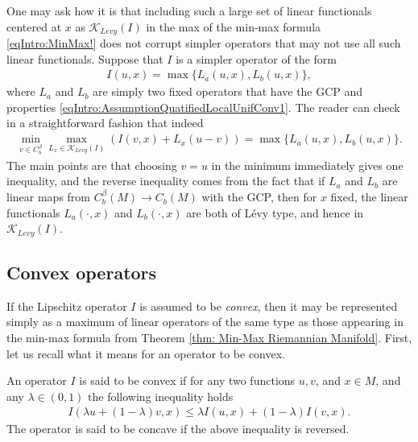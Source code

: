\documentclass[11pt,reqno]{amsart}
\numberwithin{equation}{section}
\theoremstyle{plain}
\def\K{\mathcal K}
\begin{document}
\begin{rem}
	One may ask how it is that including such a large set of linear functionals centered at $x$ as $\K_{Levy}(I)$ in the max of the min-max formula \eqref{eqIntro:MinMax!} does not corrupt simpler operators that may not use all such linear functionals.  Suppose that $I$ is a simpler operator of the form
	\begin{align*}
		I(u,x) = \max\{L_a(u,x), L_b(u,x)\},
	\end{align*}
	where $L_a$ and $L_b$ are simply two fixed operators that have the GCP and properties \eqref{eqIntro:AssumptionQuatifiedLocalUnifConv1}.  The reader can check in a straightforward fashion that indeed
	\begin{align*}
		\min_{v\in C^\beta_b} \max_{L_x\in \K_{Levy}(I)} \left( I(v,x) + L_x(u-v)    \right)
		= \max\{L_a(u,x), L_b(u,x)\}.
	\end{align*}
	The main points are that choosing $v=u$ in the minimum immediately gives one inequality, and the reverse inequality comes from the fact that if $L_a$ and $L_b$ are linear maps from $C^\beta_b(M)\to C_b(M)$ with the GCP, then for $x$ fixed, the linear functionals $L_a(\cdot,x)$ and $L_b(\cdot,x)$ are both of L\'evy type, and hence in $\K_{Levy}(I)$.
\end{rem}





\subsection{Convex operators} If the Lipschitz operator $I$ is assumed to be \emph{convex}, then it may be represented simply as a maximum of linear operators of the same type as those appearing in the min-max formula from Theorem \ref{thm: Min-Max Riemannian Manifold}. First, let us recall what it means for an operator to be convex. 

\begin{DEF} An operator $I$ is said to be convex if for any two functions $u,v$, and $x \in M$, and any $\lambda \in (0,1)$ the following inequality holds
  \begin{align*}
    I(\lambda u+(1-\lambda)v,x)\leq \lambda I(u,x) +(1-\lambda)I(v,x).
  \end{align*}	
  The operator is said to be concave if the above inequality is reversed. 
\end{DEF}
\end{document}
